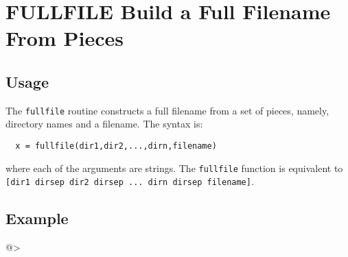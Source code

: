 \section{FULLFILE Build a Full Filename From Pieces}

\subsection{Usage}

The \verb|fullfile| routine constructs a full filename from a set of
pieces, namely, directory names and a filename.  The syntax is:
\begin{verbatim}
  x = fullfile(dir1,dir2,...,dirn,filename)
\end{verbatim}
where each of the arguments are strings.  The \verb|fullfile| function
is equivalent to \verb|[dir1 dirsep dir2 dirsep ... dirn dirsep filename]|.
\subsection{Example}

@>
